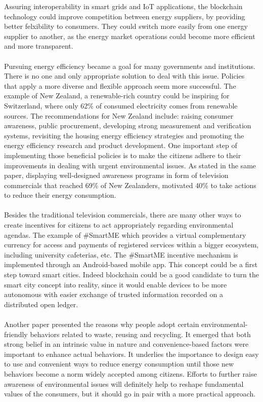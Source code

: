 \documentclass[11pt]{article}
\begin{document}
Assuring interoperability in smart grids and IoT applications, the blockchain technology could improve competition between energy suppliers, by providing better felxibility to consumers. They could switch more easily from one energy supplier to another, as the energy market operations could become more efficient and more transparent.\cite{11}\\\\
Pursuing energy efficiency became a goal for many governments and institutions. There is no one and only appropriate solution to deal with this issue. Policies that apply a more diverse and flexible approach seem more successful. The example of New Zealand, a renewable-rich country could be inspiring for Switzerland, where only 62\% of consumed electricity comes from renewable sources\cite{12}. The recommendations for New Zealand include: raising consumer awareness, public procurement, developing strong measurement and verification systems, revisiting the housing energy efficiency strategies and promoting the energy efficiency research and product development. One important step of implementing those beneficial policies is to make the citizens adhere to their improvements in dealing with urgent environmental issues. As stated in the same paper, displaying well-designed awareness programs in form of television commercials that reached 69\% of New Zealanders, motivated 40\% to take actions to reduce their energy consumption. \cite{20}\\\\
Besides the traditional television commercials, there are many other ways to create incentives for citizens to act appropriately regarding environmental agendas. The example of \#SmartME which provides a virtual complementary currency for access and payments of registered services within a bigger ecosystem, including university cafeterias, etc. The \#SmartME incentive mechanism is implemented through an Android-based mobile app. This concept could be a first step toward smart cities. Indeed blockchain could be a good candidate to turn the smart city concept into reality, since it would enable devices to be more autonomous with easier exchange of trusted information recorded on a distributed open ledger.\cite{21}\\\\
Another paper presented the reasons why people adopt certain environmental-friendly behaviors related to waste, reusing and recycling. It emerged that both strong belief in an intrinsic value in nature and convenience-based factors were important to enhance actual behaviors. It underlies the importance to design easy to use and convenient ways to reduce energy consumption until those new behaviors become a norm widely accepted among citizens. Efforts to further raise awareness of environmental issues will definitely help to reshape fundamental values of the consumers, but it should go in pair with a more practical approach.\cite{13}\\\\
\end{document}
